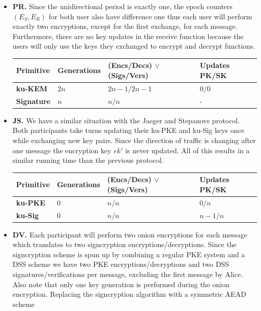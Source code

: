 \documentclass[11pt,a4paper,twoside,openright,bibliography=totoc]{scrbook}
\begin{document}
\begin{itemize}
\item \textbf{PR.} Since the unidirectional period is exactly one,
  the epoch counters $(E_S,E_R)$ for both user also have difference one
  thus each user will perform exactly two encryptions, except for the
  first exchange, for each message.
  Furthermore, there are no key updates in the receive function because
  the users will only use the keys they exchanged to encrypt and decrypt
  functions.
  \begin{center}
    \begin{tabular}{ | l | l | l | l |}
    \hline
    Primitive & Generations & (Encs/Decs) $\vee$ (Sigs/Vers) & Updates PK/SK \\ \hline
    \textbf{ku-KEM} & $2n$ & $2n-1/2n-1$ & $0/0$ \\ \hline
    \textbf{Signature} & $n$ & $n/n$ & - \\  
    \hline
    \end{tabular}
  \end{center}
\item \textbf{JS.} We have a similar situation with the Jaeger and Stepanovs
  protocol. Both participants take turns updating their ku-PKE and
  ku-Sig keys once while exchanging new key pairs. Since the direction
  of traffic is changing after one message the encryption key $ek'$
  is never updated. All of this results in a similar running time
  than the previous protocol.
  \begin{center}
    \begin{tabular}{ | l | l | l | l |}
    \hline
    Primitive & Generations & (Encs/Decs) $\vee$ (Sigs/Vers) & Updates PK/SK \\ \hline
    \textbf{ku-PKE} & $0$ & $n/n$ & $0/n$ \\ \hline
    \textbf{ku-Sig} & $0$ & $n/n$ & $n-1/n$ \\  
    \hline
    \end{tabular}
  \end{center}
\item \textbf{DV.} Each participant will perform two onion encryptions
  for each message which translates to two signcryption
  encryptions/decryptions. Since the signcryption scheme is spun up by combining
  a regular PKE system and a DSS scheme we have two PKE encryptions/decryptions
  and two DSS signatures/verifications per message, excluding
  the first message by Alice. Also note that
  only one key generation is performed during the onion encryption.
  Replacing the signcryption algorithm with a symmetric AEAD scheme

\end{itemize}
\end{document}
